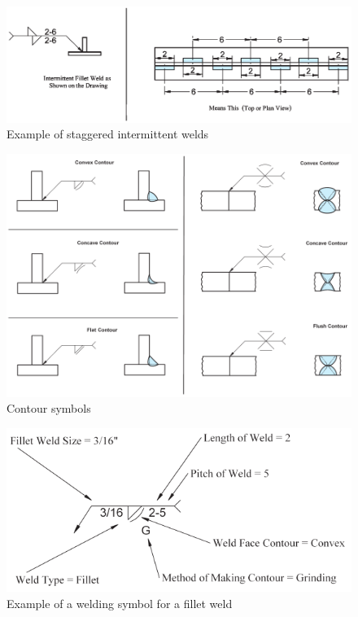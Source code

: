 \begin{figure}[H]
\centering
\includegraphics[width=.99\textwidth]{PIC/CH07/EXAMPLE/IW2}
\caption{Example of staggered intermittent welds \citep{Corgan2017}}
\end{figure}
\begin{figure}[H]
\centering
\includegraphics[width=.85\textwidth]{PIC/CH07/EXAMPLE/CS}
\caption{Contour symbols \citep{Corgan2017}}
\end{figure}
\begin{figure}[H]
\centering
\includegraphics{PIC/CH07/EXAMPLE/FW}
\caption{Example of a welding symbol for a fillet weld \citep{Corgan2017}}
\end{figure}
